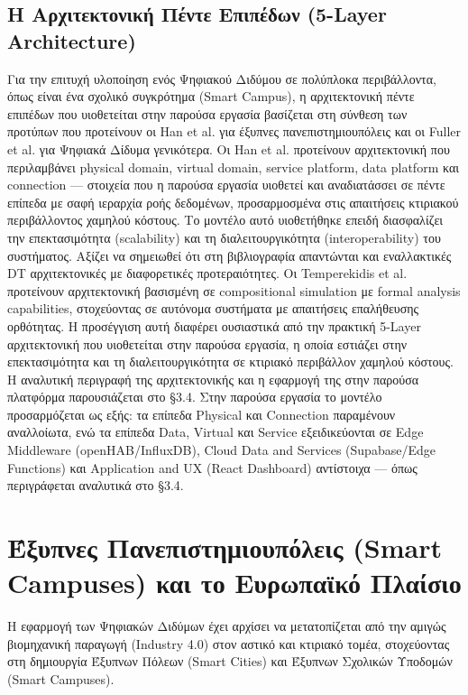 \subsection{Η Αρχιτεκτονική Πέντε Επιπέδων (\textlatin{5-Layer Architecture})}
\nocite{Doulka2024}
Για την επιτυχή υλοποίηση ενός Ψηφιακού Διδύμου σε πολύπλοκα περιβάλλοντα, όπως είναι ένα σχολικό συγκρότημα (\textlatin{Smart Campus}), η αρχιτεκτονική πέντε επιπέδων που υιοθετείται στην παρούσα εργασία βασίζεται στη σύνθεση των προτύπων που προτείνουν οι \textlatin{Han et al.} \cite{Han2022} για έξυπνες πανεπιστημιουπόλεις και οι \textlatin{Fuller et al.} \cite{Fuller2020} για Ψηφιακά Δίδυμα γενικότερα. Οι \textlatin{Han et al.} \cite{Han2022} προτείνουν αρχιτεκτονική που περιλαμβάνει \textlatin{physical domain}, \textlatin{virtual domain}, \textlatin{service platform}, \textlatin{data platform} και \textlatin{connection} --- στοιχεία που η παρούσα εργασία υιοθετεί και αναδιατάσσει σε πέντε επίπεδα με σαφή ιεραρχία ροής δεδομένων, προσαρμοσμένα στις απαιτήσεις κτιριακού περιβάλλοντος χαμηλού κόστους. Το μοντέλο αυτό υιοθετήθηκε επειδή διασφαλίζει την επεκτασιμότητα (\textlatin{scalability}) και τη διαλειτουργικότητα (\textlatin{interoperability}) του συστήματος. Αξίζει να σημειωθεί ότι στη βιβλιογραφία απαντώνται και εναλλακτικές \textlatin{DT} αρχιτεκτονικές με διαφορετικές προτεραιότητες. Οι \textlatin{Temperekidis et al.} \cite{Temperekidis2023} προτείνουν αρχιτεκτονική βασισμένη σε \textlatin{compositional simulation} με \textlatin{formal analysis capabilities}, στοχεύοντας σε αυτόνομα συστήματα με απαιτήσεις επαλήθευσης ορθότητας. Η προσέγγιση αυτή διαφέρει ουσιαστικά από την πρακτική \textlatin{5-Layer} αρχιτεκτονική που υιοθετείται στην παρούσα εργασία, η οποία εστιάζει στην επεκτασιμότητα και τη διαλειτουργικότητα σε κτιριακό περιβάλλον χαμηλού κόστους. Η αναλυτική περιγραφή της αρχιτεκτονικής και η εφαρμογή της στην παρούσα πλατφόρμα παρουσιάζεται στο §3.4. Στην παρούσα εργασία το μοντέλο προσαρμόζεται ως εξής: τα επίπεδα \textlatin{Physical} και \textlatin{Connection} παραμένουν αναλλοίωτα, ενώ τα επίπεδα \textlatin{Data}, \textlatin{Virtual} και \textlatin{Service} εξειδικεύονται σε \textlatin{Edge Middleware} (\textlatin{openHAB/InfluxDB}), \textlatin{Cloud Data and Services} (\textlatin{Supabase/Edge Functions}) και \textlatin{Application and UX} (\textlatin{React Dashboard}) αντίστοιχα --- όπως περιγράφεται αναλυτικά στο §3.4.

\section{Έξυπνες Πανεπιστημιουπόλεις (\textlatin{Smart Campuses}) και το Ευρωπαϊκό Πλαίσιο}
Η εφαρμογή των Ψηφιακών Διδύμων έχει αρχίσει να μετατοπίζεται από την αμιγώς βιομηχανική παραγωγή (\textlatin{Industry 4.0}) στον αστικό και κτιριακό τομέα, στοχεύοντας στη δημιουργία Έξυπνων Πόλεων (\textlatin{Smart Cities}) και Έξυπνων Σχολικών Υποδομών (\textlatin{Smart Campuses}).


